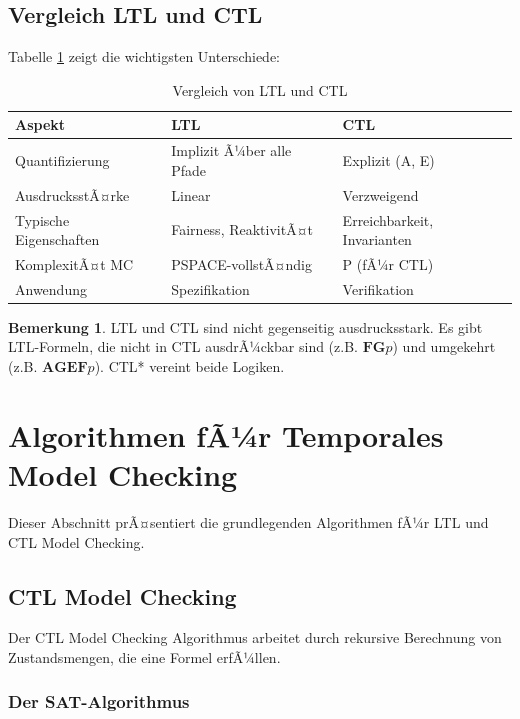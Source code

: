 ﻿\documentclass[a4paper,12pt]{article}
\theoremstyle{definition}
\newtheorem{remark}{Bemerkung}[section]
\begin{document}
\subsection{Vergleich LTL und CTL}

Tabelle \ref{tab:ltl_ctl_comparison} zeigt die wichtigsten Unterschiede:

\begin{table}[h]
	\centering
	\caption{Vergleich von LTL und CTL}
	\label{tab:ltl_ctl_comparison}
	\begin{tabular}{lll}
		\toprule
		Aspekt & LTL & CTL \\
		\midrule
		Quantifizierung & Implizit Ã¼ber alle Pfade & Explizit (A, E) \\
		AusdrucksstÃ¤rke & Linear & Verzweigend \\
		Typische Eigenschaften & Fairness, ReaktivitÃ¤t & Erreichbarkeit, Invarianten \\
		KomplexitÃ¤t MC & PSPACE-vollstÃ¤ndig & P (fÃ¼r CTL) \\
		Anwendung & Spezifikation & Verifikation \\
		\bottomrule
	\end{tabular}
\end{table}

\begin{remark}
	LTL und CTL sind nicht gegenseitig ausdrucksstark. Es gibt LTL-Formeln, die nicht in CTL ausdrÃ¼ckbar sind (z.B. $\mathbf{FG}p$) und umgekehrt (z.B. $\mathbf{AG}\mathbf{EF}p$). CTL* vereint beide Logiken.
\end{remark}

\section{Algorithmen fÃ¼r Temporales Model Checking}

Dieser Abschnitt prÃ¤sentiert die grundlegenden Algorithmen fÃ¼r LTL und CTL Model Checking.

\subsection{CTL Model Checking}

Der CTL Model Checking Algorithmus arbeitet durch rekursive Berechnung von Zustandsmengen, die eine Formel erfÃ¼llen.

\subsubsection{Der SAT-Algorithmus}
\end{document}
